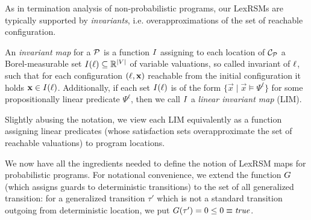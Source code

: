 
As in termination analysis of non-probabilistic programs, our LexRSMs are typically supported by \emph{invariants}, i.e. overapproximations of the set of reachable configuration. 

\begin{definition}
An \emph{invariant map} for a \PP{} $\mathcal{P}$ is a function $I$ assigning to each location of $\mathcal{C}_{\mathcal{P}}$ a Borel-measurable set $I({\ell})\subseteq \mathbb{R}^{|V|}$ of variable valuations, so called invariant of $\ell$, such that for each configuration $(\ell,\mathbf{x})$ reachable from the initial configuration it holds $\mathbf{x}\in I(\ell)$. Additionally, if each set $I(\ell)$ is of the form $\{\vec{x}\mid\vec{x}\models \Psi^\ell \}$ for some propositionally linear predicate $\Psi^\ell$, then we call $I$ a \emph{linear invariant map} (LIM).
\end{definition}

Slightly abusing the notation, we view each LIM equivalently as a function assigning linear predicates (whose satisfaction sets overapproximate the set of reachable valuations) to program locations.

We now have all the ingredients needed to define the notion of LexRSM maps for 
probabilistic programs. For notational convenience, we extend the function 
$G$ (which assigns guards to deterministic transitions) to the set of all 
generalized transition: for a generalized transition $\tau'$ which is not a 
standard transition outgoing from deterministic location, we put 
$G(\tau')=0\leq 0 \equiv \mathit{true}$. 

